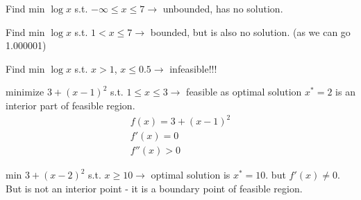 \begin{example-N}
	Find min $\log x$ s.t. $-\infty \leq x \leq 7 \rightarrow$ unbounded, has no solution.
\end{example-N}
\begin{example-N}
	Find min $\log x$ s.t. $1 < x \leq 7 \rightarrow$ bounded, but is also no solution. (as we can go 1.000001)
\end{example-N}
\begin{example-N}
	Find min $\log x$ s.t. $x > 1$, $x \leq 0.5 \rightarrow$ infeasible!!!
\end{example-N}
\begin{example-N}
	minimize $3 + (x-1)^2$ s.t. $1 \leq x \leq 3 \rightarrow$ feasible as optimal solution $x^* = 2$ is an interior part of feasible region.
	\begin{gather*}
		f(x) = 3 + (x-1)^2\\
		f'(x) = 0\\
		f''(x) > 0
	\end{gather*} 
\end{example-N}
\begin{example-N}
	min $3 + (x-2)^2$ s.t. $x \geq 10 \rightarrow$ optimal solution is $x^* = 10$. but $f'(x) \neq 0$. But is not an interior point - it is a boundary point of feasible region.\\
\end{example-N}